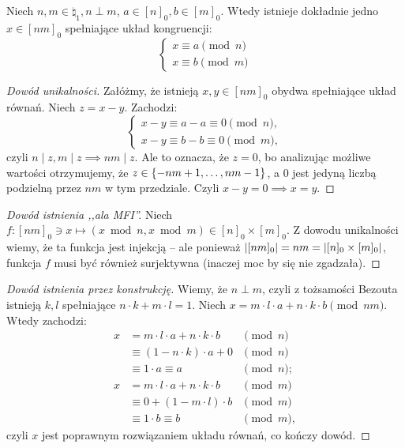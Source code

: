 \begin{theorem}
	Niech \(n, m \in \natural_1, n \perp m\), \(a \in [n]_0, b \in [m]_0\).
	Wtedy istnieje dokładnie jedno \(x \in [nm]_0\) spełniające układ kongruencji:
	\begin{equation*}
		\begin{cases}
			x \equiv a \pmod n \\
			x \equiv b \pmod m
		\end{cases}
	\end{equation*}
\end{theorem}

\begin{proof}[Dowód unikalności]
	Załóżmy, że istnieją \(x, y \in [nm]_0\) obydwa spełniające układ równań.
	Niech \(z = x-y\). Zachodzi:
	\begin{equation*}
		\begin{cases}
			x - y \equiv a - a \equiv 0 \pmod n, \\
			x - y \equiv b - b \equiv 0 \pmod m,
		\end{cases}
	\end{equation*}
	czyli \(n \mid z, m \mid z \implies nm \mid z\). Ale to oznacza, że \(z = 0\), bo analizując możliwe wartości
	otrzymujemy, że  \(z \in \set{-nm+1, \ldots, nm-1}\), a \(0\) jest jedyną liczbą podzielną przez \(nm\) w tym przedziale.
	Czyli \(x-y = 0 \implies x = y\).
\end{proof}
\begin{proof}[Dowód istnienia ,,ala MFI'']
	Niech \(f: [nm]_0 \ni x \mapsto (x \bmod n, x \bmod m) \in [n]_0 \times [m]_0\).
	Z dowodu unikalności wiemy, że ta funkcja jest injekcją -- ale
	ponieważ \(\card{[nm]_0} = nm = \card{[n]_0 \times [m]_0}\), funkcja \(f\) musi być
	również surjektywna (inaczej moc by się nie zgadzała).
\end{proof}
\begin{proof}[Dowód istnienia przez konstrukcję]
	Wiemy, że \(n \perp m\), czyli z tożsamości Bezouta istnieją \(k, l\)
	spełniające \(n \cdot k + m \cdot l = 1\).
	Niech \(x = m \cdot l \cdot a + n \cdot k \cdot b\pmod{nm}\). Wtedy zachodzi:
	\begin{align*}
		x & = m \cdot l \cdot a + n \cdot k \cdot b & \pmod n  \\
		  & \equiv (1 - n \cdot k) \cdot a + 0      & \pmod n  \\
		  & \equiv 1 \cdot a \equiv a               & \pmod n; \\
		x & = m \cdot l \cdot a + n \cdot k \cdot b & \pmod m  \\
		  & \equiv 0 + (1 - m \cdot l) \cdot b      & \pmod m  \\
		  & \equiv 1 \cdot b \equiv b               & \pmod m,
	\end{align*}
	czyli \(x\) jest poprawnym rozwiązaniem układu równań, co kończy dowód.
\end{proof}

